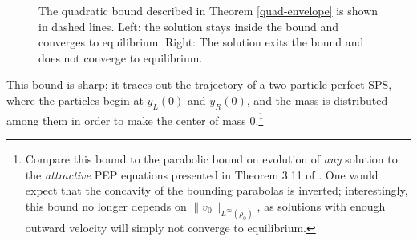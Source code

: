 \documentclass[11pt]{article}
\numberwithin{equation}{section}
\begin{document}
\begin{figure}
            \caption{The quadratic bound described in Theorem \ref{quad-envelope} is shown in dashed lines. Left: the solution stays inside the bound and converges to equilibrium. Right: The solution exits the bound and does not converge to equilibrium.}
            \label{fig:quadratic-bound}
        \end{figure} 
        
        This bound is sharp; it traces out the trajectory of a two-particle perfect SPS, where the particles begin at $y_L(0)$ and $y_R(0)$, and the mass is distributed among them in order to make the center of mass 0.\footnote{Compare this bound to the parabolic bound on evolution of \emph{any} solution to the \emph{attractive} PEP equations presented in Theorem 3.11 of \cite{BLPTW}. One would expect that the concavity of the bounding parabolas is inverted; interestingly, this bound no longer depends on $\|v_0\|_{L^\infty(\rho_0)}$, as solutions with enough outward velocity will simply not converge to equilibrium.}
    
\end{document}
